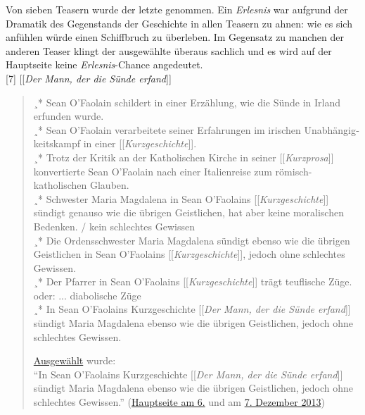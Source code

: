 \documentclass[fontsize=12pt]{scrartcl}
\begin{document}
Von sieben Teasern wurde der letzte genommen. Ein \textit{Erlesnis} war aufgrund der Dramatik des Gegenstands der Geschichte in allen Teasern zu ahnen: wie es sich anf\"uhlen w\"urde einen Schiffbruch zu \"uberleben. Im Gegensatz zu manchen der anderen Tea\-ser klingt der ausgew\"ahlte \"uberaus sachlich und es wird auf der Hauptseite keine \textit{Erlesnis}-Chance angedeutet. \\

[7] [[\textit{Der Mann, der die S\"unde erfand}]]
\singlespacing
\begin{quote}
¸* Sean O'Faolain schil\-dert in einer Erz\"ahlung, wie die S\"unde in Irland erfunden wurde.\\
¸* Sean O'Faolain verarbeitete seiner Erfah\-rungen im irischen Un\-ab\-h\"an\-gig­\-keits\-kampf in einer [[\textit{Kurzgeschichte}]].\\
¸* Trotz der Kritik an der Katholischen Kirche in seiner [[\textit{Kurzprosa}]] konvertierte Sean O'Faolain nach einer Italienreise zum r\"omisch-katholischen Glauben.\\
¸* Schwester Maria Magdalena in Sean O'Faolains [[\textit{Kurzgeschichte}]] s\"un\-digt genauso wie die \"ubrigen Geistlichen, hat aber keine moralischen Bedenken. / kein schlechtes Gewissen\\
¸* Die Ordensschwester Maria Magdalena s\"undigt ebenso wie die \"ubrigen Geistlichen in Sean O'Faolains [[\textit{Kurzgeschichte}]], jedoch ohne schlechtes Gewissen.\\
¸* Der Pfarrer in Sean O'Faolains [[\textit{Kurzgeschichte}]] tr\"agt teuflische Z\"uge. oder: ... diabolische Z\"uge\\
¸* In Sean O'Faolains Kurzgeschichte [[\textit{Der Mann, der die S\"unde erfand}]] s\"undigt Maria Magdalena ebenso wie die \"ubrigen Geistlichen, jedoch ohne schlechtes Gewissen.

\href{https://de.wikipedia.org/wiki/Wikipedia_Diskussion:Hauptseite/Schon_gewusst/Diskussionsarchiv/2013/November#Eigenvorschlag:_Der_Mann.2C_der_die_S.C3.BCnde_erfand_.283._November_2013.29_.28erl..29}{Ausgew\"ahlt} wurde:\\ 
"`In Sean O'Faolains Kurzgeschichte [[\textit{Der Mann, der die S\"unde erfand}]] s\"undigt Maria Magdalena ebenso wie die \"ubrigen Geistlichen, jedoch ohne schlechtes Gewissen."' (\href{https://de.wikipedia.org/wiki/Wikipedia:Hauptseite/Archiv/6._Dezember_2013}{Hauptseite am 6.} und am \href{https://de.wikipedia.org/wiki/Wikipedia:Hauptseite/Archiv/7._Dezember_2013}{7. Dezember 2013})
\end{quote}
\onehalfspacing
\end{document}
